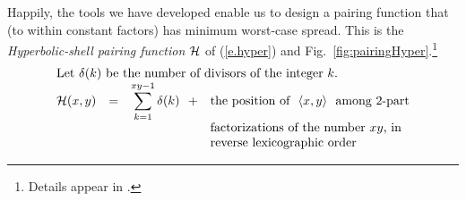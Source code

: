 Happily, the tools we have developed enable us to design a pairing
function that (to within constant factors) has minimum worst-case
spread.  This is the {\em Hyperbolic-shell pairing function} $\mbox{$\cal H$}$ of
(\ref{e.hyper}) and Fig.~\ref{fig:pairingHyper}.\footnote{Details appear in
  \cite{Rosenberg74,Rosenberg75}.}
\begin{equation}
\label{e.hyper}
\begin{array}{lcll}
\multicolumn{4}{l}{\mbox{Let $\delta(k)$ be the number of divisors of
    the integer $k$.}} \\
\h(x,y) & = & {\displaystyle \sum_{k=1}^{xy-1} \delta(k) \ \ +} &
  \mbox{the position of } \ \langle x, y \rangle \ \mbox{ among 2-part} \\
        &   &  & \mbox{factorizations of the number $xy$, in} \\
        &   &  & \mbox{reverse lexicographic order}
\end{array}
\end{equation}
